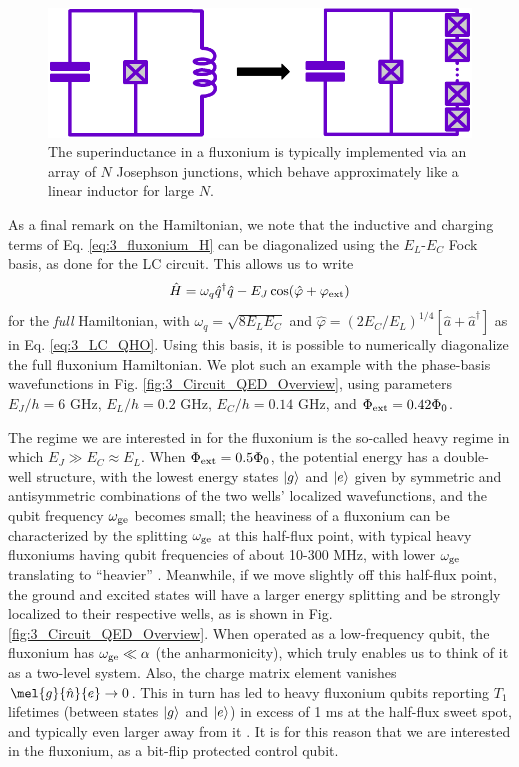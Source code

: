 \begin{figure}
    \centering
    \includegraphics[width=0.7\linewidth]{Figures/3/Superinductance.pdf}
    \caption{The superinductance in a fluxonium is typically implemented via an array of $N$ Josephson junctions, which behave approximately like a linear inductor for large $N$.}
    \label{fig:3_Superinductance}
\end{figure}

As a final remark on the Hamiltonian, we note that the inductive and charging terms of Eq. \eqref{eq:3_fluxonium_H} can be diagonalized using the $E_L$-$E_C$ Fock basis, as done for the LC circuit. This allows us to write
\begin{equation}
    \hat{H} = \omega_q\hat{q}^\dagger\hat{q} - E_J\cos(\hat{\varphi} + \varphi_{\rm ext})
\end{equation}
for the \textit{full} Hamiltonian, with $\omega_q = \sqrt{8 E_LE_C}$ and $\hat{\varphi} = (2E_C/E_L)^{1/4}[\hat{a} + \hat{a}^\dagger]$ as in Eq. \eqref{eq:3_LC_QHO}. Using this basis, it is possible to numerically diagonalize the full fluxonium Hamiltonian. We plot such an example with the phase-basis wavefunctions in Fig. \ref{fig:3_Circuit_QED_Overview}, using parameters $E_J/h = 6$ GHz,  $E_L/h = 0.2$ GHz, $E_C/h = 0.14$ GHz, and $\Phi_{\rm ext} = 0.42\Phi_0$. 

The regime we are interested in for the fluxonium is the so-called heavy regime in which $E_J \gg E_C \approx E_L$. When $\Phi_{\rm ext} = 0.5\Phi_0$, the potential energy has a double-well structure, with the lowest energy states $\lvert g\rangle$ and $\lvert e\rangle$ given by symmetric and antisymmetric combinations of the two wells' localized wavefunctions, and the qubit frequency $\omega_{\rm ge}$ becomes small; the heaviness of a fluxonium can be characterized by the splitting $\omega_{\rm ge}$ at this half-flux point, with typical heavy fluxoniums having qubit frequencies of about 10-300 MHz, with lower $\omega_{\rm ge}$ translating to ``heavier'' \cite{earnest2018realization, zhang2021universal, ding2023FTF}. Meanwhile, if we move slightly off this half-flux point, the ground and excited states will have a larger energy splitting and be strongly localized to their respective wells, as is shown in Fig. \ref{fig:3_Circuit_QED_Overview}. When operated as a low-frequency qubit, the fluxonium has $\omega_{\rm ge} \ll \alpha$ (the anharmonicity), which truly enables us to think of it as a two-level system. Also, the charge matrix element vanishes $\mel{g}{\hat{n}}{e} \to 0$. This in turn has led to heavy fluxonium qubits reporting $T_1$ lifetimes (between states $\lvert g\rangle$ and $\lvert e\rangle$) in excess of 1 ms at the half-flux sweet spot, and typically even larger away from it \cite{earnest2018realization, zhang2021universal, ding2023FTF, nguyen2019high, somoroff2023millisecond}. It is for this reason that we are interested in the fluxonium, as a bit-flip protected control qubit. 

